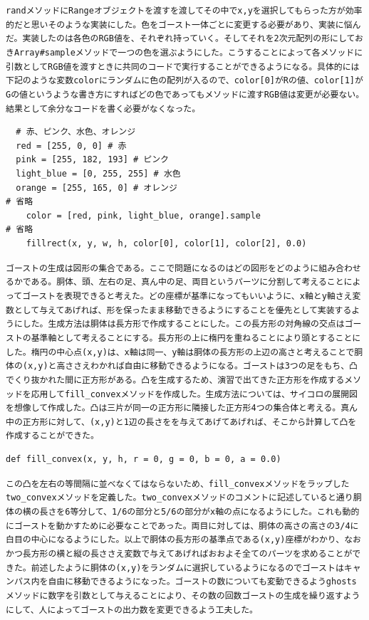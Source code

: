 \documentclass[12pt,a4j]{jarticle}
\begin{document}
\verb|randメソッドにRangeオブジェクトを渡すを渡してその中でx,yを選択してもらった方が効率的だと思いそのような実装にした。色をゴースト一体ごとに変更する必要があり、実装に悩んだ。実装したのは各色のRGB値を、それぞれ持っていく。そしてそれを2次元配列の形にしておきArray#sampleメソッドで一つの色を選ぶようにした。こうすることによって各メソッドに引数としてRGB値を渡すときに共同のコードで実行することができるようになる。具体的には下記のような変数colorにランダムに色の配列が入るので、color[0]がRの値、color[1]がGの値というような書き方にすればどの色であってもメソッドに渡すRGB値は変更が必要ない。結果として余分なコードを書く必要がなくなった。|

\begin{verbatim}
  # 赤、ピンク、水色、オレンジ
  red = [255, 0, 0] # 赤
  pink = [255, 182, 193] # ピンク
  light_blue = [0, 255, 255] # 水色
  orange = [255, 165, 0] # オレンジ
# 省略
    color = [red, pink, light_blue, orange].sample
# 省略
    fillrect(x, y, w, h, color[0], color[1], color[2], 0.0)
\end{verbatim}

\verb|ゴーストの生成は図形の集合である。ここで問題になるのはどの図形をどのように組み合わせるかである。胴体、頭、左右の足、真ん中の足、両目というパーツに分割して考えることによってゴーストを表現できると考えた。どの座標が基準になってもいいように、x軸とy軸さえ変数として与えてあげれば、形を保ったまま移動できるようにすることを優先として実装するようにした。生成方法は胴体は長方形で作成することにした。この長方形の対角線の交点はゴーストの基準軸として考えることにする。長方形の上に楕円を重ねることにより頭とすることにした。楕円の中心点(x,y)は、x軸は同一、y軸は胴体の長方形の上辺の高さと考えることで胴体の(x,y)と高ささえわかれば自由に移動できるようになる。ゴーストは3つの足をもち、凸でくり抜かれた間に正方形がある。凸を生成するため、演習で出てきた正方形を作成するメソッドを応用してfill_convexメソッドを作成した。生成方法については、サイコロの展開図を想像して作成した。凸は三片が同一の正方形に隣接した正方形4つの集合体と考える。真ん中の正方形に対して、(x,y)と1辺の長さをを与えてあげてあげれば、そこから計算して凸を作成することができた。|

\begin{verbatim}
def fill_convex(x, y, h, r = 0, g = 0, b = 0, a = 0.0)
\end{verbatim}

\verb|この凸を左右の等間隔に並べなくてはならないため、fill_convexメソッドをラップしたtwo_convexメソッドを定義した。two_convexメソッドのコメントに記述していると通り胴体の横の長さを6等分して、1/6の部分と5/6の部分がx軸の点になるようにした。これも動的にゴーストを動かすために必要なことであった。両目に対しては、胴体の高さの高さの3/4に白目の中心になるようにした。以上で胴体の長方形の基準点である(x,y)座標がわかり、なおかつ長方形の横と縦の長ささえ変数で与えてあげればおおよそ全てのパーツを求めることができた。前述したように胴体の(x,y)をランダムに選択しているようになるのでゴーストはキャンパス内を自由に移動できるようになった。ゴーストの数についても変動できるようghostsメソッドに数字を引数として与えることにより、その数の回数ゴーストの生成を繰り返すようにして、人によってゴーストの出力数を変更できるよう工夫した。|
\end{document}
